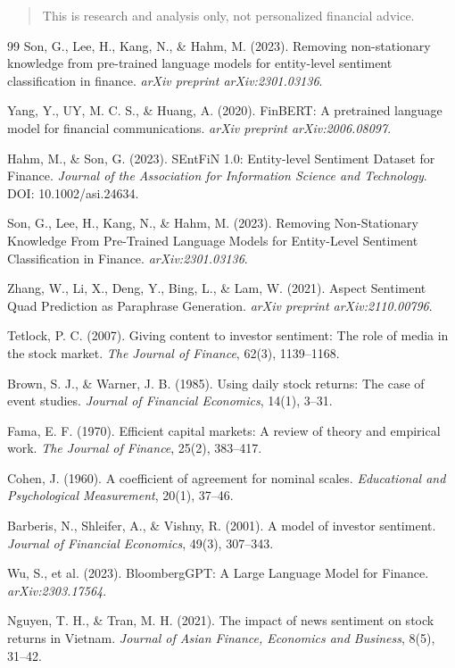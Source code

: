 \documentclass[12pt,a4paper]{article}
\begin{document}
\begin{quote}
This is research and analysis only, not personalized financial advice.
\end{quote}


\begin{thebibliography}{99}
Son, G., Lee, H., Kang, N., \& Hahm, M. (2023). Removing non-stationary knowledge from pre-trained language models for entity-level sentiment classification in finance. \textit{arXiv preprint arXiv:2301.03136}.

Yang, Y., UY, M. C. S., \& Huang, A. (2020). FinBERT: A pretrained language model for financial communications. \textit{arXiv preprint arXiv:2006.08097}.

Hahm, M., \& Son, G. (2023). SEntFiN 1.0: Entity-level Sentiment Dataset for Finance. \textit{Journal of the Association for Information Science and Technology}. DOI: 10.1002/asi.24634.

Son, G., Lee, H., Kang, N., \& Hahm, M. (2023). Removing Non-Stationary Knowledge From Pre-Trained Language Models for Entity-Level Sentiment Classification in Finance. \textit{arXiv:2301.03136}.

Zhang, W., Li, X., Deng, Y., Bing, L., \& Lam, W. (2021). Aspect Sentiment Quad Prediction as Paraphrase Generation. \textit{arXiv preprint arXiv:2110.00796}.

Tetlock, P. C. (2007). Giving content to investor sentiment: The role of media in the stock market. \textit{The Journal of Finance}, 62(3), 1139--1168.

Brown, S. J., \& Warner, J. B. (1985). Using daily stock returns: The case of event studies. \textit{Journal of Financial Economics}, 14(1), 3--31.

Fama, E. F. (1970). Efficient capital markets: A review of theory and empirical work. \textit{The Journal of Finance}, 25(2), 383--417.

Cohen, J. (1960). A coefficient of agreement for nominal scales. \textit{Educational and Psychological Measurement}, 20(1), 37--46.

Barberis, N., Shleifer, A., \& Vishny, R. (2001). A model of investor sentiment. \textit{Journal of Financial Economics}, 49(3), 307--343.

Wu, S., et al. (2023). BloombergGPT: A Large Language Model for Finance. \textit{arXiv:2303.17564}.

Nguyen, T. H., \& Tran, M. H. (2021). The impact of news sentiment on stock returns in Vietnam. \textit{Journal of Asian Finance, Economics and Business}, 8(5), 31--42.
\end{thebibliography}
\end{document}
